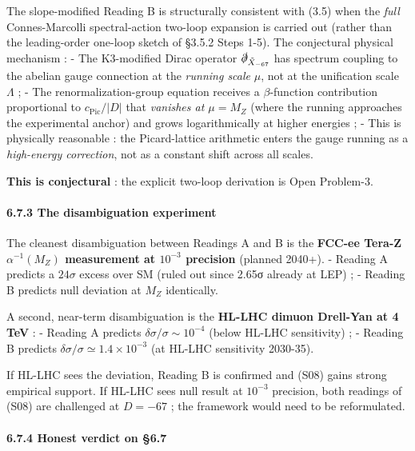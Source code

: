 \documentclass[
  11pt,
  a4paper,
]{article}
\begin{document}
The slope-modified Reading B is structurally consistent with (3.5) when the \emph{full} Connes-Marcolli spectral-action two-loop expansion is carried out (rather than the leading-order one-loop sketch of §3.5.2 Steps 1-5). The conjectural physical mechanism :
- The K3-modified Dirac operator \(\slashed\partial_{\tilde X_{-67}}\) has spectrum coupling to the abelian gauge connection at the \emph{running scale} \(\mu\), not at the unification scale \(\Lambda\) ;
- The renormalization-group equation receives a \(\beta\)-function contribution proportional to \(c_{\mathrm{Pic}}/|D|\) that \emph{vanishes at \(\mu = M_Z\)} (where the running approaches the experimental anchor) and grows logarithmically at higher energies ;
- This is physically reasonable : the Picard-lattice arithmetic enters the gauge running as a \emph{high-energy correction}, not as a constant shift across all scales.

\textbf{This is conjectural} : the explicit two-loop derivation is Open Problem-3.

\hypertarget{the-disambiguation-experiment}{%
\paragraph{6.7.3 The disambiguation experiment}\label{the-disambiguation-experiment}}

The cleanest disambiguation between Readings A and B is the \textbf{FCC-ee Tera-Z \(\alpha^{-1}(M_Z)\) measurement at \(10^{-3}\) precision} (planned 2040+).
- Reading A predicts a \(24\sigma\) excess over SM (ruled out since 2.65σ already at LEP) ;
- Reading B predicts null deviation at \(M_Z\) identically.

A second, near-term disambiguation is the \textbf{HL-LHC dimuon Drell-Yan at 4 TeV} :
- Reading A predicts \(\delta\sigma/\sigma \sim 10^{-4}\) (below HL-LHC sensitivity) ;
- Reading B predicts \(\delta\sigma/\sigma \simeq 1.4 \times 10^{-3}\) (at HL-LHC sensitivity 2030-35).

If HL-LHC sees the deviation, Reading B is confirmed and (S08) gains strong empirical support. If HL-LHC sees null result at \(10^{-3}\) precision, both readings of (S08) are challenged at \(D = -67\) ; the framework would need to be reformulated.

\hypertarget{honest-verdict-on-6.7}{%
\paragraph{6.7.4 Honest verdict on §6.7}\label{honest-verdict-on-6.7}}
\end{document}
